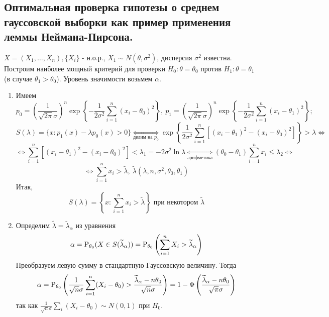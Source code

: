 \subsection{Оптимальная проверка гипотезы о среднем
гауссовской выборки как пример применения леммы Неймана-Пирсона.}
\begin{example}
    \(X = (X_1,\ldots, X_n), \{X_i\}\) - н.о.р., \(X_1 \sim N(\theta, \sigma^2)\),
    дисперсия \(\sigma^2\) известна. Построим наиболее мощный критерий
    для проверки \(H_0: \theta = \theta_0\) против \(H_1: \theta = \theta_1\)
    (в случае \(\theta_1 > \theta_0\)). Уровень значимости возьмем \(\alpha\).
    \begin{enumerate}
        \item Имеем
        \[p_0 = \left(\frac{1}{\sqrt{2\pi}\sigma}\right)^n \exp{\left\{-\frac{1}{2\sigma^2} \sum^n_{i=1} (x_i -\theta_0)^2\right\}},\
        p_1 = \left(\frac{1}{\sqrt{2\pi}\sigma}\right)^n \exp{\left\{-\frac{1}{2\sigma^2} \sum^n_{i=1} (x_i -\theta_1)^2\right\}};\]
        \[S(\lambda) = \{x:p_1(x) - \lambda p_0(x) > 0\} \underset{\text{делим на }p_0}{\Leftrightarrow}
        \exp{\left\{\frac{1}{2\sigma^2}\sum_{i=1}^n\left[ (x_i-\theta_1)^2 -(x_i-\theta_0)^2 \right]\right\}} > \lambda\Leftrightarrow\]
        \[\Leftrightarrow \sum_{i=1}^n\left[(x_i - \theta_1)^2 - (x_i - \theta_0)^2\right] < \lambda_1 = -2\sigma^2\ln\lambda
        \underset{\text{арифметика}}{\Leftrightarrow} (\theta_0 - \theta_1)\sum_{i=1}^n x_i \leq\lambda_2 \Leftrightarrow\]
        \[\Leftrightarrow \sum_{i=1}^n x_i > \widetilde{\lambda},\ \widetilde{\lambda}(\lambda, n, \sigma^2, \theta_0, \theta_1)\]
        Итак,
        \[S(\lambda) = \left\{x: \sum_{i=1}^n x_i > \widetilde{\lambda}\right\} \text{ при некотором } \widetilde{\lambda}\]

        \item Определим \(\widetilde{\lambda} = \widetilde{\lambda}_\alpha\)
            из уравнения
            \[\alpha = \P_{\theta_0}(X \in S(\widetilde{\lambda}_\alpha)) =
            \P_{\theta_0}\left(\sum_{i=1}^n X_i > \widetilde{\lambda}_\alpha\right)\]
            Преобразуем левую сумму в стандартную Гауссовскую величину. Тогда
            \[\alpha = \P_{\theta_0}\left(\frac{1}{\sqrt{n} \sigma} \sum_{i=1}^n(X_i - \theta_0) > \frac{\widetilde{\lambda}_\alpha - n\theta_0}{\sqrt{n}\sigma}\right)=
            1 - \Phi\left(\frac{\widetilde{\lambda}_\alpha - n\theta_0}{\sqrt{\pi}\sigma}\right)\]
            так как \(\frac{1}{\sqrt{n}\sigma}\sum_{i} (X_i - \theta_0) \sim N(0, 1)\) при \(H_0\).


\end{enumerate}
\end{example}
